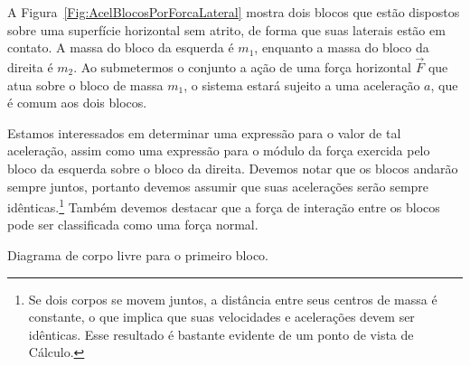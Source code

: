 A Figura~\ref{Fig:AcelBlocosPorForcaLateral} mostra dois blocos que estão dispostos sobre uma superfície horizontal sem atrito, de forma que suas laterais estão em contato. A massa do bloco da esquerda é $m_1$, enquanto a massa do bloco da direita é $m_2$. Ao submetermos o conjunto a ação de uma força horizontal $\vec{F}$ que atua sobre o bloco de massa $m_1$, o sistema estará sujeito a uma aceleração $a$, que é comum aos dois blocos.

Estamos interessados em determinar uma expressão para o valor de tal aceleração, assim como uma expressão para o módulo da força exercida pelo bloco da esquerda sobre o bloco da direita. Devemos notar que os blocos andarão sempre juntos, portanto devemos assumir que suas acelerações serão sempre idênticas.\footnote{Se dois corpos se movem juntos, a distância entre seus centros de massa é constante, o que implica que suas velocidades e acelerações devem ser idênticas. Esse resultado é bastante evidente de um ponto de vista de Cálculo.} Também devemos destacar que a força de interação entre os blocos pode ser classificada como uma força normal.

\begin{marginfigure}
\centering
{}
\caption{Diagrama de corpo livre para o primeiro bloco.\label{Fig:AcelBlocosPorForcaLateral:DiagBloco1}}
\end{marginfigure}

